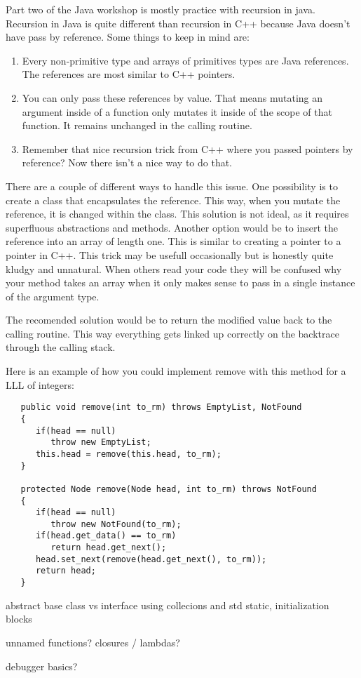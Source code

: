 \documentclass[../../main.tex]{subfiles}
\begin{document}
Part two of the Java workshop is mostly practice with recursion in java. Recursion in Java is quite
different than recursion in C++ because Java doesn't have pass by reference.
Some things to keep in mind are:
   \begin{enumerate}[label=\Alph*.]
         \item Every non-primitive type and arrays of primitives types are Java references. The references
            are most similar to C++ pointers.
         \item You can only pass these references by value. That means mutating an argument inside of
            a function only mutates it inside of the scope of that function. It remains unchanged in
            the calling routine.
         \item Remember that nice recursion trick from C++ where you passed pointers by reference? Now
            there isn't a nice way to do that.
   \end{enumerate}

There are a couple of different ways to handle this issue. One possibility is to create a class that
encapsulates the reference. This way, when you mutate the reference, it is changed within the class.
This solution is not ideal, as it requires superfluous abstractions and methods. Another option would
be to insert the reference into an array of length one. This is similar to creating a pointer to a pointer
in C++. This trick may be usefull occasionally but is honestly quite kludgy and unnatural. When others
read your code they will be confused why your method takes an array when it only makes sense to pass in a
single instance of the argument type.

The recomended solution would be to return the modified value back to the calling routine. This way
everything gets linked up correctly on the backtrace through the calling stack.

Here is an example of how you could implement remove with this method for a LLL of integers:

\begin{verbatim}
   public void remove(int to_rm) throws EmptyList, NotFound
   {
      if(head == null)
         throw new EmptyList;
      this.head = remove(this.head, to_rm);
   }

   protected Node remove(Node head, int to_rm) throws NotFound
   {
      if(head == null)
         throw new NotFound(to_rm);
      if(head.get_data() == to_rm)
         return head.get_next();
      head.set_next(remove(head.get_next(), to_rm));
      return head;
   }
\end{verbatim}

abstract base class vs interface
using collecions and std
static, initialization blocks

unnamed functions? closures / lambdas?

debugger basics?
\end{document}
